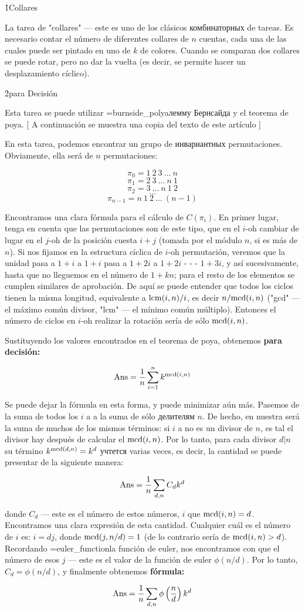 \h1{Collares}

La tarea de "collares" --- este es uno de los clásicos комбинаторных de tareas. Es necesario contar el número de diferentes collares de $n$ cuentas, cada una de las cuales puede ser pintado en uno de $k$ de colores. Cuando se comparan dos collares se puede rotar, pero no dar la vuelta (es decir, se permite hacer un desplazamiento cíclico).

\h2{para Decisión}

Esta tarea se puede utilizar \algohref=burnside_polya{лемму Бернсайда y el teorema de poya}. [ A continuación se muestra una copia del texto de este artículo ]

En esta tarea, podemos encontrar un grupo de инвариантных permutaciones. Obviamente, ella será de $n$ permutaciones:

$$ \pi_0 = 1\ 2\ 3\ \ldots\ n $$
$$ \pi_1 = 2\ 3\ \ldots\ n\ 1 $$
$$ \pi_2 = 3\ \ldots\ n\ 1\ 2 $$
$$ \ldots $$
$$ \pi_{n-1} = n\ 1\ 2\ \ldots\ (n-1) $$

Encontramos una clara fórmula para el cálculo de $C(\pi_i)$. En primer lugar, tenga en cuenta que las permutaciones son de este tipo, que en el $i$-oh cambiar de lugar en el $j$-oh de la posición cuesta $i+j$ (tomada por el módulo $n$, si es más de $n$). Si nos fijamos en la estructura cíclica de $i$-oh permutación, veremos que la unidad pasa a $1+i$ a $1+i$ pasa a $1+2i$ a $1+2i$ - - - $1+3i$, y así sucesivamente, hasta que no lleguemos en el número de $1 + kn$; para el resto de los elementos se cumplen similares de aprobación. De aquí se puede entender que todos los ciclos tienen la misma longitud, equivalente a ${\rm lcm}(i,n) / i$, es decir $n / {\rm mcd}(i,n)$ ("gcd" --- el máximo común divisor, "lcm" --- el mínimo común múltiplo). Entonces el número de ciclos en $i$-oh realizar la rotación sería de sólo ${\rm mcd}(i,n)$.

Sustituyendo los valores encontrados en el teorema de poya, obtenemos \bf{para decisión}:

$$ {\rm Ans} = \frac{1}{n} \sum_{i=1}^{n} k ^ {{\rm mcd}(i,n)} $$

Se puede dejar la fórmula en esta forma, y puede minimizar aún más. Pasemos de la suma de todos los $i$ a a la suma de sólo делителям $n$. De hecho, en nuestra será la suma de muchos de los mismos términos: si $i$ a no es un divisor de $n$, es tal el divisor hay después de calcular el ${\rm mcd}(i,n)$. Por lo tanto, para cada divisor $d|n$ su término $k^{{\rm mcd}(d,n)} = k^d$ учтется varias veces, es decir, la cantidad se puede presentar de la siguiente manera:

$$ {\rm Ans} = \frac{1}{n} \sum_{d, n} C_d k^d $$

donde $C_d$ --- este es el número de estos números, $i$ que ${\rm mcd}(i,n) = d$. Encontramos una clara expresión de esta cantidad. Cualquier cuál es el número de $i$ es: $i=dj$, donde ${\rm mcd}(j,n/d) = 1$ (de lo contrario sería de ${\rm mcd}(i,n) > d$). Recordando \algohref=euler_function{la función de euler}, nos encontramos con que el número de esos $j$ --- este es el valor de la función de euler $\phi(n/d)$. Por lo tanto, $C_d = \phi(n/d)$, y finalmente obtenemos \bf{fórmula}:

$$ {\rm Ans} = \frac{1}{n} \sum_{d, n} \phi \left( \frac{n}{d} \right) k^d $$
